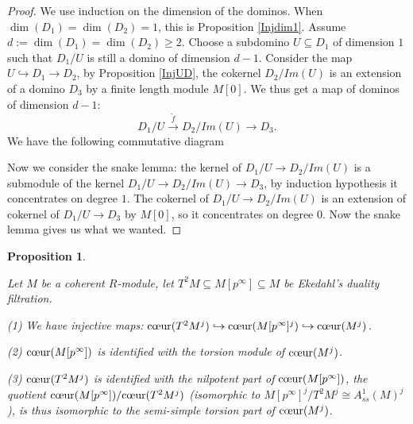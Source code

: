 \documentclass[a4paper,12pt,twoside]{report}
\newtheorem{proposition}[theorem]{Proposition}
\begin{document}
\begin{proof}
     We use induction on the dimension of the dominos. When $\dim(D_1)=\dim(D_2)=1$, this is Proposition \ref{Injdim1}. 
Assume $d:=\dim(D_1)=\dim(D_2)\geq 2$. Choose a subdomino  $U\subseteq D_1$ of dimension $1$ such that $D_1/U$ is still a domino of dimension $d-1$. 
Consider the map $U\hookrightarrow D_1\rightarrow D_2$, 
by Proposition \ref{InjUD}, the cokernel $D_2/Im(U)$ is an extension of a domino $D_3$ by a finite length module $M[0]$. 
We thus get a map of dominos of dimension $d-1$:  \[D_1/U\xrightarrow{\widetilde{f}} D_2/Im(U)\rightarrow D_3.\]
We have the following commutative diagram 
\begin{center}
\end{center}
Now we consider the snake lemma: the kernel of $D_1/U\rightarrow D_2/Im(U)$ 
is a submodule of the kernel $D_1/U\rightarrow D_2/Im(U)\rightarrow D_3$, 
by induction hypothesis it concentrates on degree $1$. 
The cokernel of $D_1/U\rightarrow D_2/Im(U)$  is an extension of cokernel of $D_1/U\rightarrow D_3$ by $M[0]$, 
so it concentrates on degree $0$. Now the snake lemma gives us what we wanted.
\end{proof} 

\begin{proposition}\label{Partsandhearts}
    
    Let $M$ be a coherent $R$-module, let $T^2M\subseteq M[p^\infty]\subseteq M$ be Ekedahl's duality filtration. 
    
    {\rm (1)} We have injective maps: $\text{\rm {c\oe ur}}(T^2M^j)\hookrightarrow \text{\rm {c\oe ur}}(M[p^\infty]^j)\hookrightarrow \text{\rm {c\oe ur}}(M^j)$. 

    {\rm (2)} $\text{\rm {c\oe ur}}(M[p^\infty])$ is identified with the torsion module of $\text{\rm {c\oe ur}}(M^j)$. 

    {\rm (3)}  $\text{\rm {c\oe ur}}(T^2M^j)$ is identified with the nilpotent part of  $\text{\rm {c\oe ur}}(M[p^\infty])$, 
    the quotient $\text{\rm {c\oe ur}}(M[p^\infty])/\text{\rm {c\oe ur}}(T^2M^j)$ (isomorphic to 
    $M[p^\infty]^j/T^2M^j\cong A^1_{ss}(M)^j$), is thus isomorphic to the semi-simple torsion part of $\text{\rm {c\oe ur}}(M^j)$. 
\end{proposition}
\end{document}
